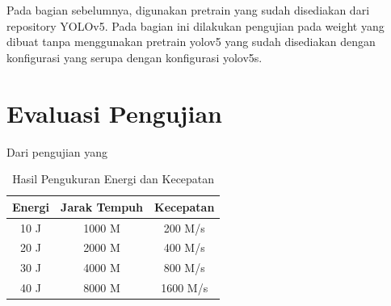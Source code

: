 Pada bagian sebelumnya, digunakan pretrain yang sudah disediakan dari repository YOLOv5. Pada bagian ini dilakukan pengujian pada weight yang dibuat tanpa menggunakan pretrain yolov5 yang sudah disediakan dengan konfigurasi yang serupa dengan konfigurasi yolov5s.



\section{Evaluasi Pengujian}
\label{sec:analisispengujian}

Dari pengujian yang \lipsum[1]

\begin{longtable}{|c|c|c|}
  \caption{Hasil Pengukuran Energi dan Kecepatan}
  \label{tb:EnergiKecepatan}\\
  \hline
  \rowcolor[HTML]{C0C0C0}
  \textbf{Energi} & \textbf{Jarak Tempuh} & \textbf{Kecepatan} \\
  \hline
  10 J & 1000 M & 200 M/s \\
  20 J & 2000 M & 400 M/s \\
  30 J & 4000 M & 800 M/s \\
  40 J & 8000 M & 1600 M/s \\
  \hline
\end{longtable}

\lipsum[2-4]
